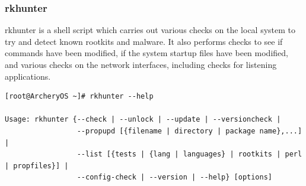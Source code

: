 \documentclass{article}
\begin{document}
\subsubsection{rkhunter}
rkhunter  is a shell script which carries out various checks on the local system to try and detect known rootkits and malware. It also performs checks to see if commands have been modified, if the system startup files have been modified, and various checks on the network interfaces,  including  checks  for listening applications.
\begin{lstlisting}
[root@ArcheryOS ~]# rkhunter --help

Usage: rkhunter {--check | --unlock | --update | --versioncheck |
                 --propupd [{filename | directory | package name},...] |
                 --list [{tests | {lang | languages} | rootkits | perl | propfiles}] |
                 --config-check | --version | --help} [options]


\end{lstlisting}
\end{document}

